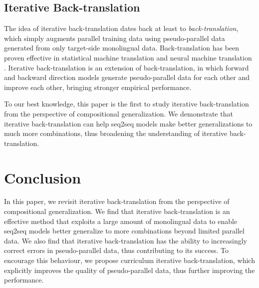 \documentclass[letterpaper]{article} %
\begin{document}
\subsection{Iterative Back-translation}
The idea of iterative back-translation dates back at least to \emph{back-translation}, which simply augments parallel training data using pseudo-parallel data generated from only target-side monolingual data.
Back-translation has been proven effective in statistical machine translation \cite{goutte2009learning,bojar2011improving} and neural machine translation \cite{sennrich2016improving,edunov2018understanding,imamura2018enhancement,xia2019generalized,wang2019improving}.
Iterative back-translation \cite{hoang2018iterative,cotterell2018explaining,lample2018unsupervised,conneau2019cross} is an extension of back-translation, in which forward and backward direction models generate pseudo-parallel data for each other and improve each other, bringing stronger empirical performance.

To our best knowledge, this paper is the first to study iterative back-translation from the perspective of compositional generalization.
We demonstrate that iterative back-translation can help seq2seq models make better generalizations to much more combinations, thus broadening the understanding of iterative back-translation.

\section{Conclusion}
In this paper, we revisit iterative back-translation from the perspective of compositional generalization.
We find that iterative back-translation is an effective method that exploits a large amount of monolingual data to enable seq2seq models better generalize to more combinations beyond limited parallel data.
We also find that iterative back-translation has the ability to increasingly correct errors in pseudo-parallel data, thus contributing to its success.
To encourage this behaviour, we propose curriculum iterative back-translation, which explicitly improves the quality of pseudo-parallel data, thus further improving the performance.
\end{document}
